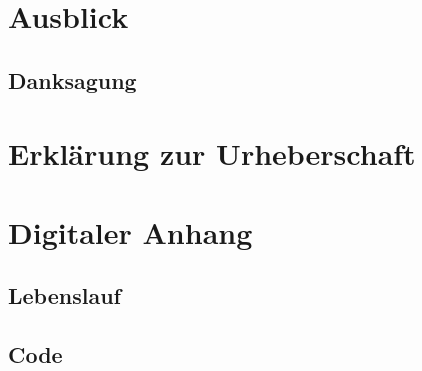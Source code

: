 \documentclass[a4paper,12pt]{article}
\begin{document}
\section{Ausblick}

\newpage
\subsection*{Danksagung}


\newpage
%


\newpage
\section*{Erklärung zur Urheberschaft}


\newpage


\newpage
\listoffigures


\newpage
\section*{Digitaler Anhang}


%

%

%

\subsection*{Lebenslauf}


\subsection*{Code}

\end{document}
